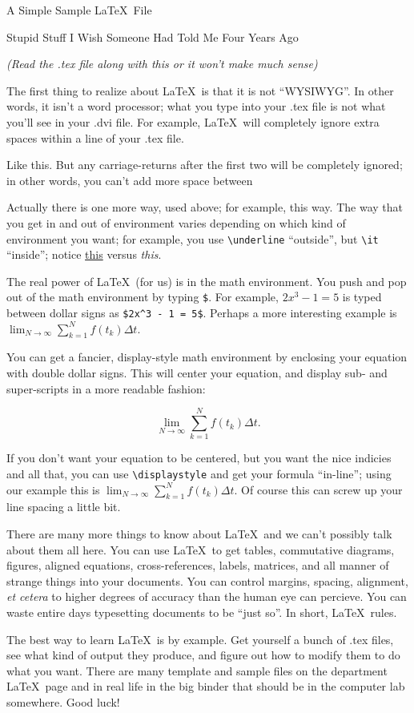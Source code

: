 \documentclass{article}
\begin{document}
\centerline{\sc \large A Simple Sample \LaTeX\ File}
\vspace{.5pc}
\centerline{\sc Stupid Stuff I Wish Someone Had Told Me Four Years Ago}
\centerline{\it (Read the .tex file along with this or it won't
            make much sense)}
\vspace{2pc}

The first thing to realize about \LaTeX\ is that it is not ``WYSIWYG''.
In other words, it isn't a word processor; what you type into your
.tex file is not what you'll see in your .dvi file.  For example,
\LaTeX\ will      completely     ignore               extra
spaces    within                             a line of your .tex file.

Like this.  But any carriage-returns after the first two will be
completely ignored; in other words, you
can't
add
more
space
between

\noindent Actually there is one more way, used above; for example,
{\sc this way}.  The way that you get in and out of environment varies
depending on which kind of environment you want; for example, you use
\verb|\underline| ``outside'', but \verb|\it| ``inside'';
notice \underline{this} versus {\it this}.

The real power of \LaTeX\ (for us) is in the math environment. You
push and pop out of the math environment by typing \verb|$|. For
example, $2x^3 - 1 = 5$ is typed between dollar signs as
\verb|$2x^3 - 1 = 5$|. Perhaps a more interesting example is
$\lim_{N \to \infty} \sum_{k=1}^N f(t_k) \Delta t$.

You can get a fancier, display-style math
environment by enclosing your equation with double dollar signs.
This will center your equation, and display sub- and super-scripts in
a more readable fashion:

$$\lim_{N \to \infty} \sum_{k=1}^N f(t_k) \Delta t.$$

If you don't want your equation to be centered, but you want the nice
indicies and all that, you can use \verb|\displaystyle| and get your
formula ``in-line''; using our example this is
$\displaystyle \lim_{N \to \infty} \sum_{k=1}^N f(t_k) \Delta t.$  Of
course this can screw up your line spacing a little bit.

There are many more things to know about \LaTeX\ and we can't
possibly talk about them all here.
You can use \LaTeX\ to get tables, commutative diagrams, figures,
aligned equations, cross-references, labels, matrices, and all manner
of strange things into your documents.  You can control margins,
spacing, alignment, {\it et cetera} to higher degrees of accuracy than
the human eye can percieve.  You can waste entire days typesetting
documents to be ``just so''.  In short, \LaTeX\ rules.

The best way to learn \LaTeX\ is by example. Get yourself a bunch
of .tex files, see what kind of output they produce, and figure out how
to modify them to do what you want.  There are many template and
sample files on the department \LaTeX\ page and in real life in the
big binder that should be in the computer lab somewhere.  Good luck!
\end{document}
